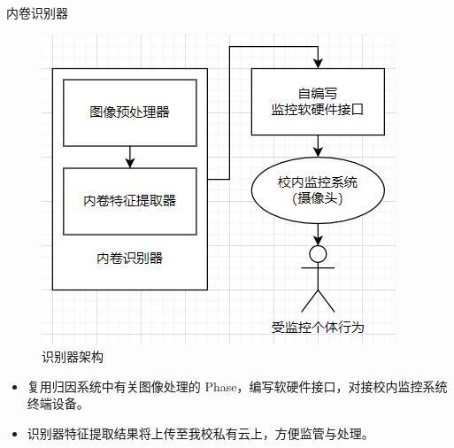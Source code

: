     \begin{frame}{内卷识别器}
        \begin{figure}
            \centering
            \includegraphics[width=.4\textwidth]{contents/figure/data-detector.png}
            \caption{识别器架构}
            \label{fig:data-detector}
        \end{figure}

        \begin{itemize}
            \item \small 复用归因系统中有关图像处理的 Phase，编写软硬件接口，对接校内监控系统终端设备。
            \item \small 识别器特征提取结果将上传至我校私有云上，方便监管与处理。
        \end{itemize}
    \end{frame}

